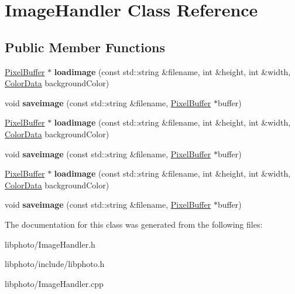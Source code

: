 \hypertarget{classImageHandler}{\section{Image\-Handler Class Reference}
\label{classImageHandler}
}
\subsection*{Public Member Functions}
\begin{DoxyCompactItemize}
\item 
\hypertarget{classImageHandler_a0042244c7f1462f4ffc2403f139bf286}{\hyperlink{classPixelBuffer}{Pixel\-Buffer} $\ast$ {\bfseries loadimage} (const std\-::string \&filename, int \&height, int \&width, \hyperlink{classColorData}{Color\-Data} background\-Color)}\label{classImageHandler_a0042244c7f1462f4ffc2403f139bf286}

\item 
\hypertarget{classImageHandler_ace874907681fc4970f6a2ae2377833b9}{void {\bfseries saveimage} (const std\-::string \&filename, \hyperlink{classPixelBuffer}{Pixel\-Buffer} $\ast$buffer)}\label{classImageHandler_ace874907681fc4970f6a2ae2377833b9}

\item 
\hypertarget{classImageHandler_abaa3474d1e118bf82209cc3499468572}{\hyperlink{classPixelBuffer}{Pixel\-Buffer} $\ast$ {\bfseries loadimage} (const std\-::string \&filename, int \&height, int \&width, \hyperlink{classColorData}{Color\-Data} background\-Color)}\label{classImageHandler_abaa3474d1e118bf82209cc3499468572}

\item 
\hypertarget{classImageHandler_ace874907681fc4970f6a2ae2377833b9}{void {\bfseries saveimage} (const std\-::string \&filename, \hyperlink{classPixelBuffer}{Pixel\-Buffer} $\ast$buffer)}\label{classImageHandler_ace874907681fc4970f6a2ae2377833b9}

\item 
\hypertarget{classImageHandler_abaa3474d1e118bf82209cc3499468572}{\hyperlink{classPixelBuffer}{Pixel\-Buffer} $\ast$ {\bfseries loadimage} (const std\-::string \&filename, int \&height, int \&width, \hyperlink{classColorData}{Color\-Data} background\-Color)}\label{classImageHandler_abaa3474d1e118bf82209cc3499468572}

\item 
\hypertarget{classImageHandler_ace874907681fc4970f6a2ae2377833b9}{void {\bfseries saveimage} (const std\-::string \&filename, \hyperlink{classPixelBuffer}{Pixel\-Buffer} $\ast$buffer)}\label{classImageHandler_ace874907681fc4970f6a2ae2377833b9}

\end{DoxyCompactItemize}


The documentation for this class was generated from the following files\-:\begin{DoxyCompactItemize}
\item 
libphoto/Image\-Handler.\-h\item 
libphoto/include/libphoto.\-h\item 
libphoto/Image\-Handler.\-cpp\end{DoxyCompactItemize}
